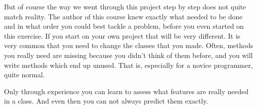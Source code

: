 But of course the way we went through this project step by step does not quite match reality. The author of this course knew exactly what needed to be done and in what order you could best tackle a problem, before you even started on this exercise. If you start on your own project that will be very different. It is very common that you need to change the classes that you made. Often, methods you really need are missing because you didn't think of them before, and you will write methods which end up unused. That is, especially for a novice programmer, quite normal.

Only through experience you can learn to assess what features are really needed in a class. And even then you can not always predict them exactly.